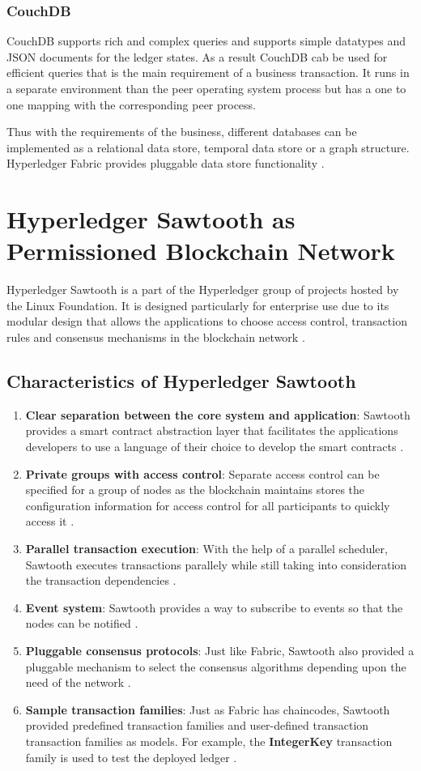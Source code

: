 \documentclass[
  a4paper,  %
  twoside,  %
  bibliography=totoc,
  headsepline,
  cleardoublepage=empty,
  parskip=half,
  draft=false
]{scrbook}
\begin{document}
\subsubsection{CouchDB}
CouchDB supports rich and complex queries and supports simple datatypes and JSON documents for the ledger states. As a result CouchDB cab be used for efficient queries that is the main requirement of a business transaction. It runs in a separate environment than the peer operating system process but has a one to one mapping with the corresponding peer process.

Thus with the requirements of the business, different databases can be implemented as a relational data store, temporal data store or a graph structure. Hyperledger Fabric provides pluggable data store functionality \cite{Ledger}.
\section{Hyperledger Sawtooth as Permissioned Blockchain Network}
Hyperledger Sawtooth is a part of the Hyperledger group of projects hosted by the Linux Foundation. It is designed particularly for enterprise use due to its modular design that allows the applications to choose access control, transaction rules and consensus mechanisms in the blockchain network \cite{saw}. 
\subsection{Characteristics of Hyperledger Sawtooth}
\begin{enumerate}
    \item \textbf{Clear separation between the core system and application}: Sawtooth provides a smart contract abstraction layer that facilitates the applications developers to use a language of their choice to develop the smart contracts \cite{saw}.
    \item \textbf{Private groups with access control}: Separate access control can be specified for a group of nodes as the blockchain maintains stores the configuration information for access control for all participants to quickly access it \cite{saw}.
    \item \textbf{Parallel transaction execution}: With the help of a parallel scheduler, Sawtooth executes transactions parallely while still taking into consideration the transaction dependencies \cite{saw}.
    \item \textbf{Event system}: Sawtooth provides a way to subscribe to events so that the nodes can be notified \cite{saw}.
    \item \textbf{Pluggable consensus protocols}: Just like Fabric, Sawtooth also provided a pluggable mechanism to select the consensus algorithms depending upon the need of the network \cite{saw}.
    \item \textbf{Sample transaction families}: Just as Fabric has chaincodes, Sawtooth provided predefined transaction families and user-defined transaction transaction families as models. For example, the \textbf{IntegerKey} transaction family is used to test the deployed ledger \cite{saw}.
\end{enumerate}
\end{document}
